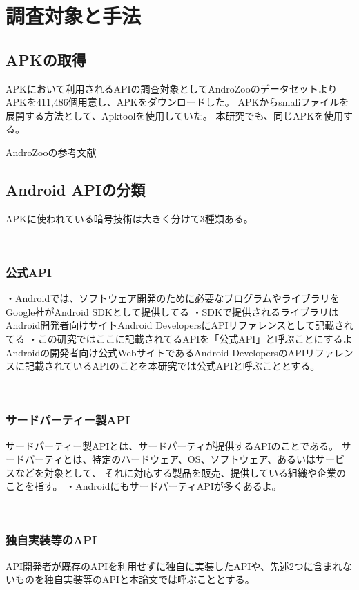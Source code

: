 \newpage

\section{調査対象と手法}
\subsection {APKの取得}

APKにおいて利用されるAPIの調査対象としてAndroZooのデータセットよりAPKを411,486個用意し、APKをダウンロードした。
APKからsmaliファイルを展開する方法として、Apktoolを使用していた。
本研究でも、同じAPKを使用する。


AndroZooの参考文献

\subsection{Android APIの分類}
APKに使われている暗号技術は大きく分けて3種類ある。

　\subsubsection {公式API}

・Androidでは、ソフトウェア開発のために必要なプログラムやライブラリをGoogle社がAndroid SDKとして提供してる
・SDKで提供されるライブラリはAndroid開発者向けサイトAndroid DevelopersにAPIリファレンスとして記載されてる
・この研究ではここに記載されてるAPIを「公式API」と呼ぶことにするよ
Androidの開発者向け公式WebサイトであるAndroid DevelopersのAPIリファレンスに記載されているAPIのことを本研究では公式APIと呼ぶこととする。

　\subsubsection {サードパーティー製API}
サードパーティー製APIとは、サードパーティが提供するAPIのことである。
サードパーティとは、特定のハードウェア、OS、ソフトウェア、あるいはサービスなどを対象として、
それに対応する製品を販売、提供している組織や企業のことを指す。
・AndroidにもサードパーティAPIが多くあるよ。

　\subsubsection {独自実装等のAPI}
API開発者が既存のAPIを利用せずに独自に実装したAPIや、先述2つに含まれないものを独自実装等のAPIと本論文では呼ぶこととする。

